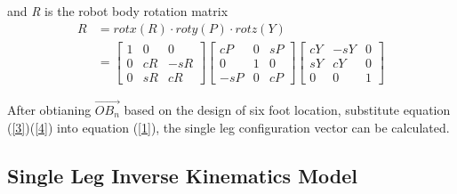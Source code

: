 \documentclass[conference]{IEEEtran}
\begin{document}
and \textit{R} is the robot body rotation matrix 
\begin{equation}\label{4}
\begin{aligned}
R &= rotx(R)\cdot roty(P) \cdot rotz(Y)\\
&= \begin{bmatrix}
    1 & 0 & 0 \\
    0 & cR & -sR\\
    0 & sR & cR
    \end{bmatrix}
    \begin{bmatrix}
        cP & 0 & sP \\
        0 & 1 & 0\\
        -sP & 0 & cP
        \end{bmatrix}
        \begin{bmatrix}
            cY & -sY & 0 \\
            sY & cY & 0\\
            0 & 0 & 1
            \end{bmatrix}
\end{aligned}
\end{equation}

After obtianing \(\overrightarrow{OB_n}\) based on the design of six foot location, substitute equation (\ref{3})(\ref{4}) into equation (\ref{1}), the single leg configuration vector can be calculated.

\subsection{Single Leg Inverse Kinematics Model}
\end{document}

